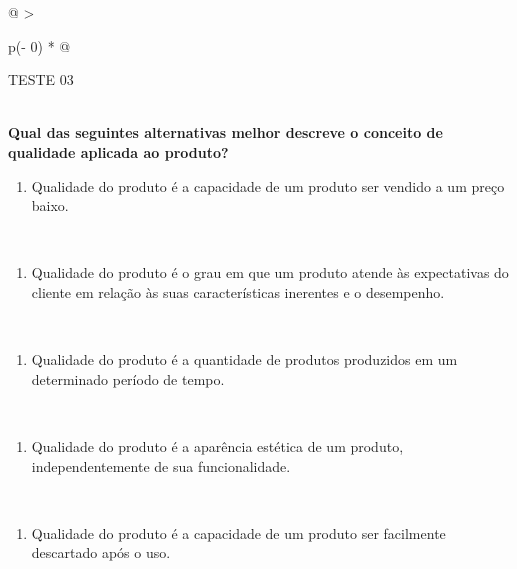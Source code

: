 \documentclass[
]{book}
\providecommand{\tightlist}{%
  \setlength{\itemsep}{0pt}\setlength{\parskip}{0pt}}
\begin{document}
\begin{longtable}[]{@{}
  >{\raggedright\arraybackslash}p{(\columnwidth - 0\tabcolsep) * }@{}}
\toprule\noalign{}
\begin{minipage}[b]{\linewidth}\raggedright
TESTE 03
\end{minipage} \\
\midrule\noalign{}
\endhead
\bottomrule\noalign{}
\endlastfoot
\textbf{Qual das seguintes alternativas melhor descreve o conceito de qualidade aplicada ao produto?} \\
\begin{minipage}[t]{\linewidth}\raggedright
\begin{enumerate}
\def\labelenumi{\alph{enumi})}
\tightlist
\item
  Qualidade do produto é a capacidade de um produto ser vendido a um preço baixo.
\end{enumerate}
\end{minipage} \\
\begin{minipage}[t]{\linewidth}\raggedright
\begin{enumerate}
\def\labelenumi{\alph{enumi})}
\setcounter{enumi}{1}
\tightlist
\item
  Qualidade do produto é o grau em que um produto atende às expectativas do cliente em relação às suas características inerentes e o desempenho.
\end{enumerate}
\end{minipage} \\
\begin{minipage}[t]{\linewidth}\raggedright
\begin{enumerate}
\def\labelenumi{\alph{enumi})}
\setcounter{enumi}{2}
\tightlist
\item
  Qualidade do produto é a quantidade de produtos produzidos em um determinado período de tempo.
\end{enumerate}
\end{minipage} \\
\begin{minipage}[t]{\linewidth}\raggedright
\begin{enumerate}
\def\labelenumi{\alph{enumi})}
\setcounter{enumi}{3}
\tightlist
\item
  Qualidade do produto é a aparência estética de um produto, independentemente de sua funcionalidade.
\end{enumerate}
\end{minipage} \\
\begin{minipage}[t]{\linewidth}\raggedright
\begin{enumerate}
\def\labelenumi{\alph{enumi})}
\setcounter{enumi}{4}
\tightlist
\item
  Qualidade do produto é a capacidade de um produto ser facilmente descartado após o uso.
\end{enumerate}
\end{minipage} \\
\end{longtable}
\end{document}
